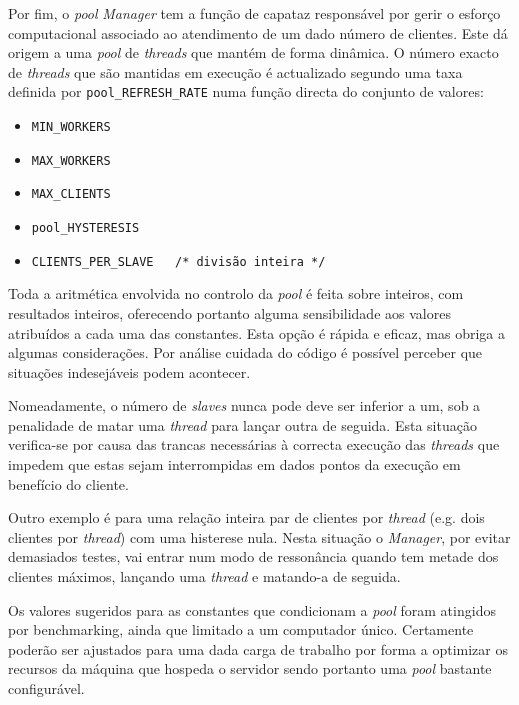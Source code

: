 	\setlength{\parskip}{20pt}		%

	Por fim, o \emph{pool} \emph{Manager} tem a função de capataz responsável por gerir o esforço computacional associado ao atendimento de um dado número de clientes.
	Este dá origem a uma \emph{pool} de \emph{threads} que mantém de forma dinâmica.
	O número exacto de \emph{threads} que são mantidas em execução é actualizado segundo uma taxa definida por \verb|pool_REFRESH_RATE| numa função directa do conjunto de valores:

	\setlength{\parskip}{5pt}		%

	\begin{itemize}
		\setlength{\parskip}{-3pt}
		\item{\verb|MIN_WORKERS|}
		\item{\verb|MAX_WORKERS|}
		\item{\verb|MAX_CLIENTS|}
		\item{\verb|pool_HYSTERESIS|}
		\item{\verb|CLIENTS_PER_SLAVE	/* divisão inteira */|}
	\end{itemize}

	Toda a aritmética envolvida no controlo da \emph{pool} é feita sobre inteiros, com resultados inteiros, oferecendo portanto alguma sensibilidade aos valores atribuídos a cada uma das constantes.
	Esta opção é rápida e eficaz, mas obriga a algumas considerações.
	Por análise cuidada do código é possível perceber que situações indesejáveis podem acontecer.

	Nomeadamente, o número de \emph{slaves} nunca pode deve ser inferior a um, sob a penalidade de matar uma \emph{thread} para lançar outra de seguida.
	Esta situação verifica-se por causa das trancas necessárias à correcta execução das \emph{threads} que impedem que estas sejam interrompidas em dados pontos da execução em benefício do cliente.

	Outro exemplo é para uma relação inteira par de clientes por \emph{thread} (e.g. dois clientes por \emph{thread}) com uma histerese nula.
	Nesta situação o \emph{Manager}, por evitar demasiados testes, vai entrar num modo de ressonância quando tem metade dos clientes máximos, lançando uma \emph{thread} e matando-a de seguida.

	Os valores sugeridos para as constantes que condicionam a \emph{pool} foram atingidos por benchmarking, ainda que limitado a um computador único.
	Certamente poderão ser ajustados para uma dada carga de trabalho por forma a optimizar os recursos da máquina que hospeda o servidor sendo portanto uma \emph{pool} bastante configurável.

